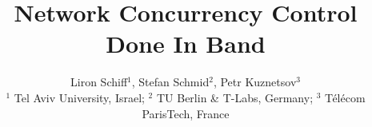 \documentclass[conference]{sigcomm-alternate}
\begin{document}
\sloppy





\title{Network Concurrency Control Done In Band}




\author{
Liron Schiff$^1$, %
Stefan Schmid$^2$, Petr Kuznetsov$^3$ \\
\small $^1$ Tel Aviv University, Israel; $^2$ TU Berlin \& T-Labs,
Germany; $^3$ T\'el\'ecom ParisTech, France
}


\date{}


\maketitle


\thispagestyle{empty}


\end{document}
